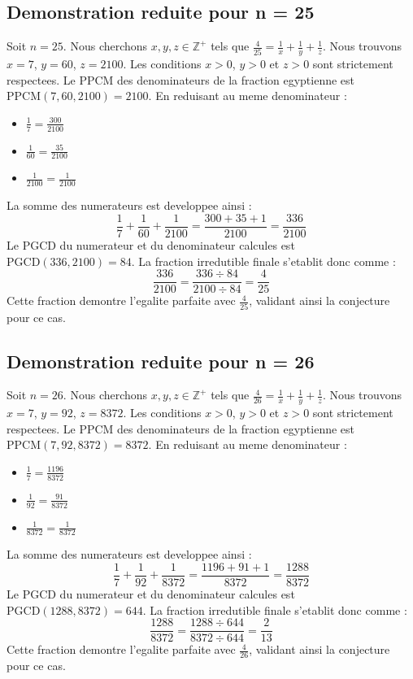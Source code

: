 \documentclass[11pt,a4paper]{article}
\begin{document}
\subsection{Demonstration reduite pour n = 25}
Soit $n = 25$. Nous cherchons $x, y, z \in \mathbb{Z}^{+}$ tels que $\frac{4}{25} = \frac{1}{x} + \frac{1}{y} + \frac{1}{z}$.
Nous trouvons $x = 7$, $y = 60$, $z = 2100$.
Les conditions $x > 0$, $y > 0$ et $z > 0$ sont strictement respectees.
Le PPCM des denominateurs de la fraction egyptienne est $\text{PPCM}(7, 60, 2100) = 2100$.
En reduisant au meme denominateur :
\begin{itemize}
    \item $\frac{1}{7} = \frac{300}{2100}$
    \item $\frac{1}{60} = \frac{35}{2100}$
    \item $\frac{1}{2100} = \frac{1}{2100}$
\end{itemize}
La somme des numerateurs est developpee ainsi :
$$ \frac{1}{7} + \frac{1}{60} + \frac{1}{2100} = \frac{300 + 35 + 1}{2100} = \frac{336}{2100} $$
Le PGCD du numerateur et du denominateur calcules est $\text{PGCD}(336, 2100) = 84$.
La fraction irredutible finale s'etablit donc comme :
$$ \frac{336}{2100} = \frac{336 \div 84}{2100 \div 84} = \frac{4}{25} $$
Cette fraction demontre l'egalite parfaite avec $\frac{4}{25}$, validant ainsi la conjecture pour ce cas.

\subsection{Demonstration reduite pour n = 26}
Soit $n = 26$. Nous cherchons $x, y, z \in \mathbb{Z}^{+}$ tels que $\frac{4}{26} = \frac{1}{x} + \frac{1}{y} + \frac{1}{z}$.
Nous trouvons $x = 7$, $y = 92$, $z = 8372$.
Les conditions $x > 0$, $y > 0$ et $z > 0$ sont strictement respectees.
Le PPCM des denominateurs de la fraction egyptienne est $\text{PPCM}(7, 92, 8372) = 8372$.
En reduisant au meme denominateur :
\begin{itemize}
    \item $\frac{1}{7} = \frac{1196}{8372}$
    \item $\frac{1}{92} = \frac{91}{8372}$
    \item $\frac{1}{8372} = \frac{1}{8372}$
\end{itemize}
La somme des numerateurs est developpee ainsi :
$$ \frac{1}{7} + \frac{1}{92} + \frac{1}{8372} = \frac{1196 + 91 + 1}{8372} = \frac{1288}{8372} $$
Le PGCD du numerateur et du denominateur calcules est $\text{PGCD}(1288, 8372) = 644$.
La fraction irredutible finale s'etablit donc comme :
$$ \frac{1288}{8372} = \frac{1288 \div 644}{8372 \div 644} = \frac{2}{13} $$
Cette fraction demontre l'egalite parfaite avec $\frac{4}{26}$, validant ainsi la conjecture pour ce cas.
\end{document}
